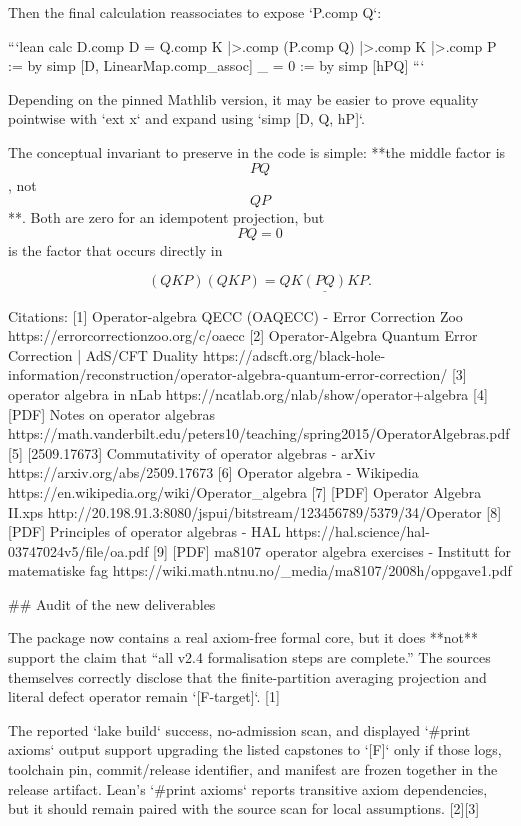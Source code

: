 Then the final calculation reassociates to expose `P.comp Q`:

```lean
calc
  D.comp D
      = Q.comp K |>.comp (P.comp Q) |>.comp K |>.comp P := by
          simp [D, LinearMap.comp_assoc]
  _   = 0 := by simp [hPQ]
```

Depending on the pinned Mathlib version, it may be easier to prove equality pointwise with `ext x` and expand using `simp [D, Q, hP]`.

The conceptual invariant to preserve in the code is simple: **the middle factor is $$PQ$$, not $$QP$$**. Both are zero for an idempotent projection, but $$PQ=0$$ is the factor that occurs directly in

$$
(QKP)(QKP)=QK\underline{(PQ)}KP.
$$

Citations:
[1] Operator-algebra QECC (OAQECC) - Error Correction Zoo https://errorcorrectionzoo.org/c/oaecc
[2] Operator-Algebra Quantum Error Correction | AdS/CFT Duality https://adscft.org/black-hole-information/reconstruction/operator-algebra-quantum-error-correction/
[3] operator algebra in nLab https://ncatlab.org/nlab/show/operator+algebra
[4] [PDF] Notes on operator algebras https://math.vanderbilt.edu/peters10/teaching/spring2015/OperatorAlgebras.pdf
[5] [2509.17673] Commutativity of operator algebras - arXiv https://arxiv.org/abs/2509.17673
[6] Operator algebra - Wikipedia https://en.wikipedia.org/wiki/Operator_algebra
[7] [PDF] Operator Algebra II.xps http://20.198.91.3:8080/jspui/bitstream/123456789/5379/34/Operator%
[8] [PDF] Principles of operator algebras - HAL https://hal.science/hal-03747024v5/file/oa.pdf
[9] [PDF] ma8107 operator algebra exercises - Institutt for matematiske fag https://wiki.math.ntnu.no/_media/ma8107/2008h/oppgave1.pdf

## Audit of the new deliverables

The package now contains a real axiom-free formal core, but it does **not** support the claim that “all v2.4 formalisation steps are complete.” The sources themselves correctly disclose that the finite-partition averaging projection and literal defect operator remain `[F-target]`. [1]

The reported `lake build` success, no-admission scan, and displayed `#print axioms` output support upgrading the listed capstones to `[F]` only if those logs, toolchain pin, commit/release identifier, and manifest are frozen together in the release artifact. Lean’s `#print axioms` reports transitive axiom dependencies, but it should remain paired with the source scan for local assumptions. [2][3]

